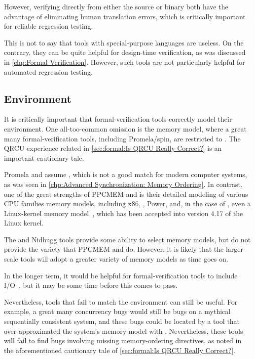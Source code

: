 However, verifying directly from either the source or binary both have the
advantage of eliminating human translation errors, which is critically
important for reliable regression testing.

This is not to say that tools with special-purpose languages are useless.
On the contrary, they can be quite helpful for design-time verification,
as was discussed in
\cref{chp:Formal Verification}.
However, such tools are not particularly helpful for automated regression
testing.

\subsection{Environment}
\label{sec:future:Environment}

It is critically important that formal-verification tools correctly
model their environment.
One all-too-common omission is the memory model, where a great
many formal-verification tools, including Promela/spin, are
restricted to .
The QRCU experience related in
\cref{sec:formal:Is QRCU Really Correct?}
is an important cautionary tale.

Promela and  assume
, which is not a
good match for modern computer systems, as was seen in
\cref{chp:Advanced Synchronization: Memory Ordering}.
In contrast, one of the great strengths of PPCMEM and 
is their detailed modeling of various CPU families memory models,
including x86, \ARM, Power, and, in the case of ,
even a Linux-kernel memory model~\cite{Alglave:2018:FSC:3173162.3177156},
which has been accepted into version 4.17 of
the Linux kernel.

The  and Nidhugg tools provide some ability to select
memory models, but do not provide the variety that PPCMEM and
 do.
However, it is likely that the larger-scale tools will adopt
a greater variety of memory models as time goes on.

In the longer term, it would be helpful for formal-verification
tools to include I/O~\cite{PaulEMcKenney2016LinuxKernelMMIO},
but it may be some time before this comes to pass.

Nevertheless, tools that fail to match the environment can still
be useful.
For example, a great many concurrency bugs would still be bugs on
a mythical sequentially consistent system, and these bugs could
be located by a tool that over-approximated the system's memory model
with .
Nevertheless, these tools will fail to find bugs involving missing
memory-ordering directives, as noted in the aforementioned
cautionary tale of
\cref{sec:formal:Is QRCU Really Correct?}.

